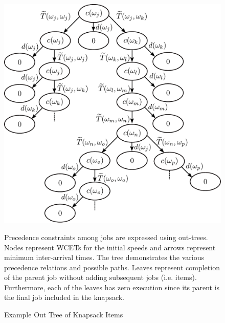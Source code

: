 \begin{figure}
    \centering
    \includegraphics[width=1.0\linewidth]{fig/vectorKnapsackTreeShortenedv5.pdf}
    \caption{Example Out Tree of Knapsack Items}Precedence constraints among jobs are expressed using out-trees. Nodes represent WCETs for the initial speeds and arrows represent minimum inter-arrival times. The tree demonstrates the various precedence relations and possible paths. Leaves represent completion of the parent job without adding subsequent jobs (i.e. items). Furthermore, each of the leaves has zero execution since its parent is the final job included in the knapsack.
    \label{fig:KnapsackTree}
\end{figure}


